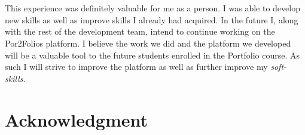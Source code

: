 \documentclass[a4paper,12pt,journal,twoside,compsoc]{PPIEEEtran}
\begin{document}
\section{}
This experience was definitely valuable for me as a person. I was able to develop new skills as well as improve skills I already had acquired. In the future I, along with the rest of the development team, intend to continue working on the Por2Folios platform. I believe the work we did and the platform we developed will be a valuable tool to the future students enrolled in the Portfolio course. As such I will strive to improve the platform as well as further improve my \textit{soft-skills}. 
\ifCLASSOPTIONcompsoc
  \section*{} %
\else
  \section*{Acknowledgment}
\fi
\end{document}
